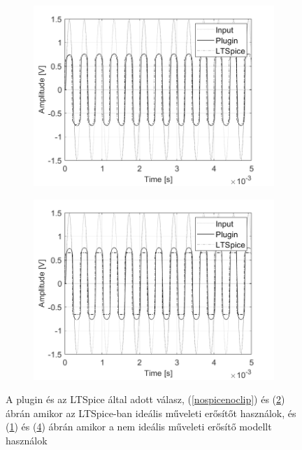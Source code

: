 \begin{figure}[H]
\begin{subfigure}{0.47\textwidth}
        \caption{}
        \label{nospiceclip}
    \end{subfigure}
    \begin{subfigure}{0.47\textwidth}
        \centering
        \includegraphics[scale=0.38]{figures/spicenoclip.png}
        \caption{}
        \label{spicenoclip}
    \end{subfigure}
    \hfill
    \begin{subfigure}{0.47\textwidth}
        \centering
        \includegraphics[scale=0.38]{figures/spiceclip.png}
        \caption{}
        \label{spiceclip}
    \end{subfigure}
    \caption{A plugin és az LTSpice által adott válasz, (\ref{nospicenoclip}) és (\ref{spicenoclip}) ábrán amikor az LTSpice-ban ideális műveleti erősítőt használok, és (\ref{nospiceclip}) és (\ref{spiceclip}) ábrán amikor a nem ideális műveleti erősítő modellt használok}
\end{figure}
